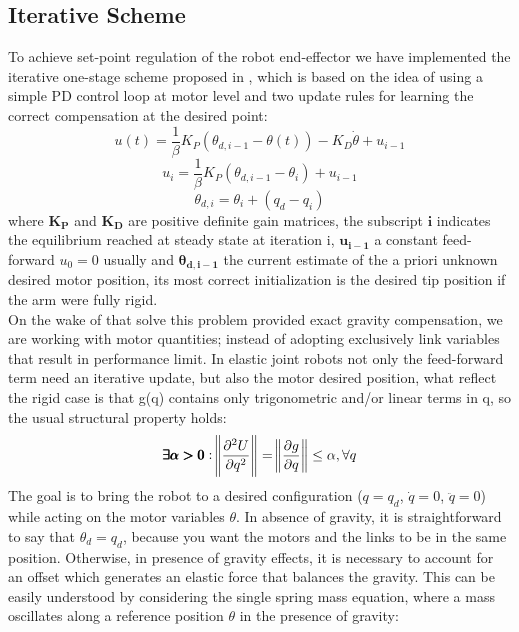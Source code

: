 \subsection{Iterative Scheme}
To achieve set-point regulation of the robot end-effector we have implemented the iterative one-stage scheme proposed in \cite{deluca96}, which is based on the idea of using a simple PD control loop at motor level and two update rules for learning the correct compensation at the desired point:
\begin{equation}\label{eq:clow}
    u(t) = \frac{1}{\beta}K_P(\theta_{d,i-1}-\theta(t))-K_D\dot{\theta}+u_{i-1}
\end{equation}
\begin{equation}\label{eq:u_up}
    u_i = \frac{1}{\beta}K_P(\theta_{d,i-1}-\theta_i) + u_{i-1}
\end{equation}
\begin{equation}\label{eq:mot_up}
    \theta_{d,i} = \theta_i + (q_d - q_i)
\end{equation}
where $\pmb{K_P}$ and $\pmb{K_D}$ are positive definite gain matrices, the subscript \(\pmb{i}\) indicates the equilibrium reached at steady state at iteration i, $\pmb{u_{i-1}}$ a constant feed-forward $u_0=0$ usually and $\pmb{\theta_{d,i-1}}$ the current estimate of the a priori unknown desired motor position, its most correct initialization is the desired tip position if the arm were fully rigid. \\ On the wake of \cite{simplepd,13sic} that solve this problem provided exact gravity compensation, we are working with motor quantities; instead of adopting exclusively link variables that result in performance limit. In elastic joint robots not only the feed-forward term need an iterative update, but also the motor desired position, what reflect the rigid case is that g(q) contains only trigonometric and/or linear terms in q, so the usual structural property holds:
\begin{equation}\label{eq:stprop}
    \pmb{\exists \alpha>0}: \norm{\frac{\partial^2U}{\partial q^2}}=\norm{\frac{\partial g}{\partial q}} \leq \alpha, \forall q
\end{equation}
The goal is to bring the robot to a desired configuration (\(q=q_d\), \(\dot q = 0\), \(\ddot q = 0\)) while acting on the motor variables \(\theta\). In absence of gravity, it is straightforward to say that \(\theta_d = q_d\), because you want the motors and the links to be in the same position. Otherwise, in presence of gravity effects, it is necessary to account for an offset which generates an elastic force that balances the gravity. This can be easily understood by considering the single spring mass equation, where a mass oscillates along a reference position \(\theta\) in the presence of gravity:
